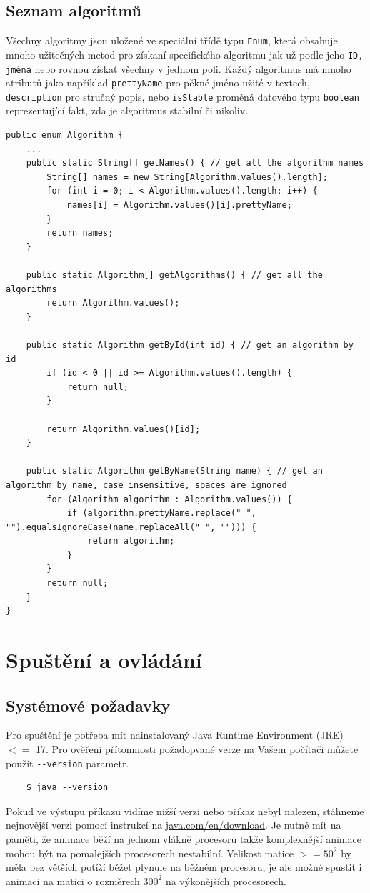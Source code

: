 \documentclass{article}
\begin{document}
\subsection{Seznam algoritmů}
Všechny algoritmy jsou uložené ve speciální třídě typu \verb|Enum|, která obsahuje mnoho užitečných metod pro získaní specifického algoritmu jak už podle jeho \verb|ID, jména| nebo rovnou získat všechny v jednom poli. Každý algoritmus má mnoho atributů jako například \verb|prettyName| pro pěkné jméno užité v textech, \verb|description| pro stručný popis, nebo \verb|isStable| proměná datového typu \verb|boolean| reprezentující fakt, zda je algoritmus stabilní či nikoliv.
\begin{verbatim}
public enum Algorithm {
    ...
    public static String[] getNames() { // get all the algorithm names
        String[] names = new String[Algorithm.values().length];
        for (int i = 0; i < Algorithm.values().length; i++) {
            names[i] = Algorithm.values()[i].prettyName;
        }
        return names;
    }

    public static Algorithm[] getAlgorithms() { // get all the algorithms
        return Algorithm.values();
    }

    public static Algorithm getById(int id) { // get an algorithm by id
        if (id < 0 || id >= Algorithm.values().length) {
            return null;
        }

        return Algorithm.values()[id];
    }

    public static Algorithm getByName(String name) { // get an algorithm by name, case insensitive, spaces are ignored
        for (Algorithm algorithm : Algorithm.values()) {
            if (algorithm.prettyName.replace(" ", "").equalsIgnoreCase(name.replaceAll(" ", ""))) {
                return algorithm;
            }
        }
        return null;
    }
}
\end{verbatim}
\section{Spuštění a ovládání}
\subsection{Systémové požadavky}
Pro spuštění je potřeba mít nainstalovaný Java Runtime Environment (JRE) \(<=\) 17. Pro ověření přítomnosti požadopvané verze na Vašem počítači můžete použít \verb|--version| parametr.
\begin{verbatim}
    $ java --version
\end{verbatim}
Pokud ve výstupu příkazu vidíme nižší verzi nebo příkaz nebyl nalezen, stáhneme nejnovější verzi pomocí instrukcí na \href{https://www.java.com/en/download/}{java.com/en/download}.
Je nutné mít na paměti, že animace běží na jednom vlákně procesoru takže komplexnější animace mohou být na pomalejších procesorech nestabilní. Velikost matice \(>= 50^2\) by měla bez větších potíží běžet plynule na běžném procesoru, je ale možné spustit i animaci na matici o rozměrech \(300^2\) na výkonějších procesorech.
\end{document}

